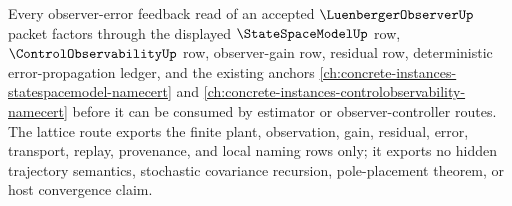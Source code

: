Every observer-error feedback read of an accepted $\LuenbergerObserverUp$ packet factors through the displayed $\StateSpaceModelUp$ row, $\ControlObservabilityUp$ row, observer-gain row, residual row, deterministic error-propagation ledger, and the existing anchors \autoref{ch:concrete-instances-statespacemodel-namecert} and \autoref{ch:concrete-instances-controlobservability-namecert} before it can be consumed by estimator or observer-controller routes. The lattice route exports the finite plant, observation, gain, residual, error, transport, replay, provenance, and local naming rows only; it exports no hidden trajectory semantics, stochastic covariance recursion, pole-placement theorem, or host convergence claim.
